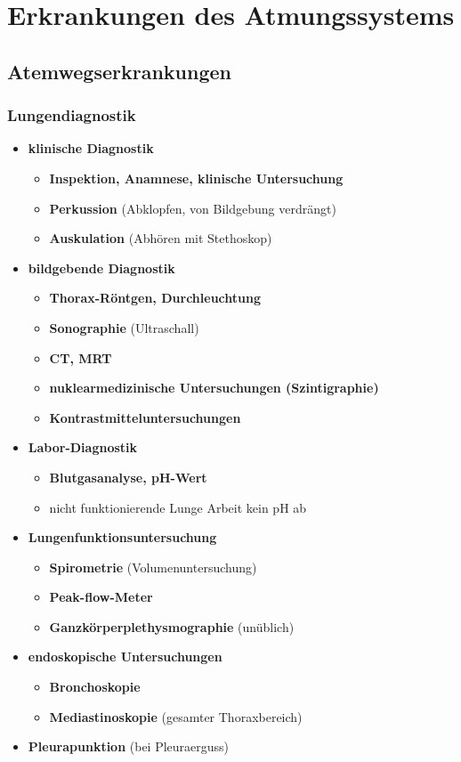 \section{Erkrankungen des Atmungssystems}
\subsection{Atemwegserkrankungen}
	\subsubsection{Lungendiagnostik}
		\begin{itemize}
			\item \textbf{klinische Diagnostik}
				\begin{itemize}
					\item \textbf{Inspektion, Anamnese, klinische Untersuchung}
					\item \textbf{Perkussion} (Abklopfen, von Bildgebung verdrängt)
					\item \textbf{Auskulation} (Abhören mit Stethoskop)
				\end{itemize}
			\item \textbf{bildgebende Diagnostik}
				\begin{itemize}
					\item \textbf{Thorax-Röntgen, Durchleuchtung}
					\item \textbf{Sonographie} (Ultraschall)
					\item \textbf{CT, MRT}
					\item \textbf{nuklearmedizinische Untersuchungen (Szintigraphie)}
					\item \textbf{Kontrastmitteluntersuchungen} 
				\end{itemize}
			\item \textbf{Labor-Diagnostik}
				\begin{itemize}
					\item \textbf{Blutgasanalyse, pH-Wert}
					\item nicht funktionierende Lunge Arbeit kein pH ab
				\end{itemize}
			\item \textbf{Lungenfunktionsuntersuchung}
				\begin{itemize}
					\item \textbf{Spirometrie} (Volumenuntersuchung)
					\item \textbf{Peak-flow-Meter}
					\item \textbf{Ganzkörperplethysmographie} (unüblich)
				\end{itemize}
			\item \textbf{endoskopische Untersuchungen}
				\begin{itemize}
					\item \textbf{Bronchoskopie}
					\item \textbf{Mediastinoskopie} (gesamter Thoraxbereich)
				\end{itemize}
			\item \textbf{Pleurapunktion} (bei Pleuraerguss)
		\end{itemize}
